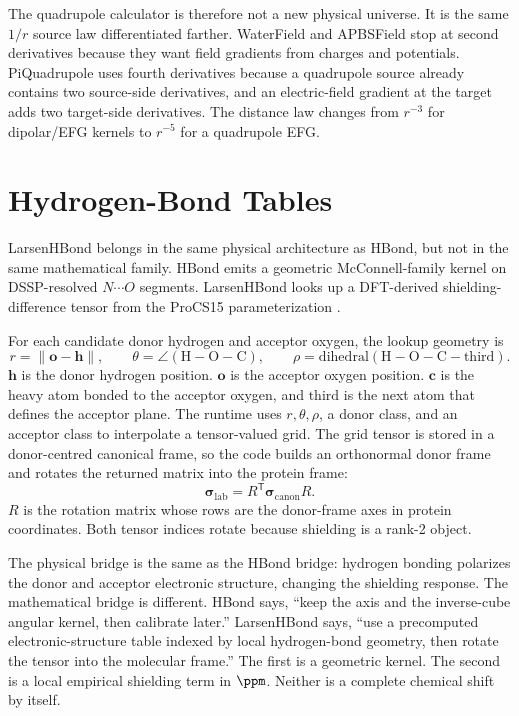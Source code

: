 \documentclass[11pt]{article}
\begin{document}
The quadrupole calculator is therefore not a new physical universe. It is the
same \(1/r\) source law differentiated farther. WaterField and APBSField stop at
second derivatives because they want field gradients from charges and
potentials. PiQuadrupole uses fourth derivatives because a quadrupole source
already contains two source-side derivatives, and an electric-field gradient at
the target adds two target-side derivatives. The distance law changes from
\(r^{-3}\) for dipolar/EFG kernels to \(r^{-5}\) for a quadrupole EFG.

\section{Hydrogen-Bond Tables}

LarsenHBond belongs in the same physical architecture as HBond, but not in the
same mathematical family. HBond emits a geometric McConnell-family kernel on
DSSP-resolved \(N\cdots O\) segments. LarsenHBond looks up a DFT-derived
shielding-difference tensor from the ProCS15 parameterization \cite{larsen2015}.

For each candidate donor hydrogen and acceptor oxygen, the lookup geometry is
\[
  r=\|\bm o-\bm h\|,
  \qquad
  \theta=\angle(\mathrm H-\mathrm O-\mathrm C),
  \qquad
  \rho=\mathrm{dihedral}(\mathrm H-\mathrm O-\mathrm C-\mathrm{third}).
\]
\(\bm h\) is the donor hydrogen position. \(\bm o\) is the acceptor oxygen
position. \(\bm c\) is the heavy atom bonded to the acceptor oxygen, and
\(\mathrm{third}\) is the next atom that defines the acceptor plane. The runtime
uses \(r,\theta,\rho\), a donor class, and an acceptor class to interpolate a
tensor-valued grid. The grid tensor is stored in a donor-centred canonical
frame, so the code builds an orthonormal donor frame and rotates the returned
matrix into the protein frame:
\[
  \bm\sigma_{\mathrm{lab}}
  =
  R^{\mathsf T}
  \bm\sigma_{\mathrm{canon}}
  R .
\]
\(R\) is the rotation matrix whose rows are the donor-frame axes in protein
coordinates. Both tensor indices rotate because shielding is a rank-2 object.

The physical bridge is the same as the HBond bridge: hydrogen bonding polarizes
the donor and acceptor electronic structure, changing the shielding response.
The mathematical bridge is different. HBond says, ``keep the axis and the
inverse-cube angular kernel, then calibrate later.'' LarsenHBond says, ``use a
precomputed electronic-structure table indexed by local hydrogen-bond geometry,
then rotate the tensor into the molecular frame.'' The first is a geometric
kernel. The second is a local empirical shielding term in \(\si{\ppm}\).
Neither is a complete chemical shift by itself.
\end{document}
